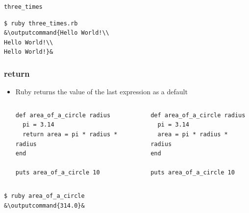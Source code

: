 \documentclass{beamer}
\newcommand{\outputcommand}[1]{\color{darkgreen}{#1}}
\begin{document}
\begin{frame}
\begin{itemize}
\begin{lstlisting}[escapechar=&]
three_times
\end{lstlisting}


\lstset{language=shell}
\begin{lstlisting}[numbers=none, escapechar=&]
$ ruby three_times.rb
&\outputcommand{Hello World!\\
Hello World!\\
Hello World!}&
\end{lstlisting}

\end{itemize}

\end{frame}
\begin{frame}[fragile]
\frametitle{return}
\begin{itemize}
\item Ruby returns the value of the last expression as a default
\begin{columns}
  \lstset{language=Ruby, style=eclipse}
  \begin{lstlisting}[escapechar=&]
def area_of_a_circle radius
  pi = 3.14
  return area = pi * radius * radius
end

puts area_of_a_circle 10
  \end{lstlisting}

\lstset{language=Ruby, style=eclipse}
  \begin{lstlisting}[escapechar=&]
def area_of_a_circle radius
  pi = 3.14
  area = pi * radius * radius
end

puts area_of_a_circle 10
  \end{lstlisting}
\end{columns}
\end{itemize}

\lstset{language=shell}
\begin{lstlisting}[numbers=none, escapechar=&]
$ ruby area_of_a_circle
&\outputcommand{314.0}&
\end{lstlisting}

\end{frame}
\end{document}
